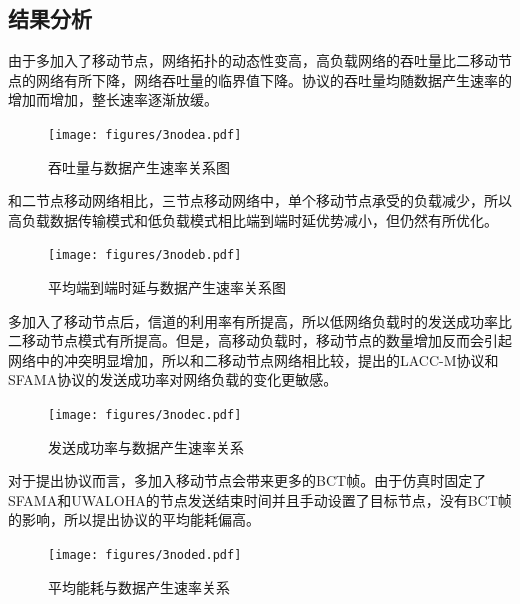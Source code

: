 \subsection{结果分析}
由于多加入了移动节点，网络拓扑的动态性变高，高负载网络的吞吐量比二移动节点的网络有所下降，网络吞吐量的临界值下降。协议的吞吐量均随数据产生速率的增加而增加，整长速率逐渐放缓。

\begin{figure}[!ht]
	\centering
	\texttt{[image: figures/3nodea.pdf]}
	\caption{
		吞吐量与数据产生速率关系图
	}
	\label{fig:example}
\end{figure}

和二节点移动网络相比，三节点移动网络中，单个移动节点承受的负载减少，所以高负载数据传输模式和低负载模式相比端到端时延优势减小，但仍然有所优化。
\begin{figure}[!ht]
	\centering
	\texttt{[image: figures/3nodeb.pdf]}
	\caption{
		平均端到端时延与数据产生速率关系图
	}
	\label{fig:example}
\end{figure}

多加入了移动节点后，信道的利用率有所提高，所以低网络负载时的发送成功率比二移动节点模式有所提高。但是，高移动负载时，移动节点的数量增加反而会引起网络中的冲突明显增加，所以和二移动节点网络相比较，提出的LACC-M协议和SFAMA协议的发送成功率对网络负载的变化更敏感。

\begin{figure}[!ht]
	\centering
	\texttt{[image: figures/3nodec.pdf]}
	\caption{
		发送成功率与数据产生速率关系
	}
	\label{fig:example}
\end{figure}

对于提出协议而言，多加入移动节点会带来更多的BCT帧。由于仿真时固定了SFAMA和UWALOHA的节点发送结束时间并且手动设置了目标节点，没有BCT帧的影响，所以提出协议的平均能耗偏高。

\begin{figure}[!ht]
	\centering
	\texttt{[image: figures/3noded.pdf]}
	\caption{
		平均能耗与数据产生速率关系
	}
	\label{fig:example}
\end{figure}

\endinput